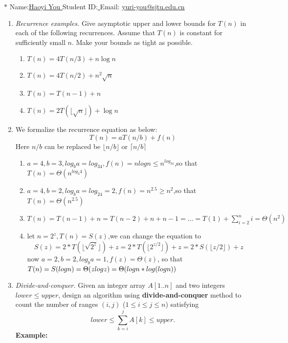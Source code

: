 \documentclass[12pt,a4paper]{article}
\makeatletter
\newtheorem*{solution}{Solution}
\theoremstyle{definition}
\renewenvironment{solution}[1][Solution] {\par\pushQED{\qed}\normalfont\topsep6\p@\@plus6\p@\relax\trivlist\item[\hskip\labelsep\bfseries#1\@addpunct{.}]\ignorespaces}{\popQED\endtrivlist\@endpefalse} \makeatother
\makeatother
\begin{document}
\noindent

\noindent{}
\begin{center}

\footnotesize{\color{blue}$*$ Name:\underline{\quad   Haoyi You  \quad  }\quad Student ID:\underline{ \quad} \quad Email: \underline{\quad yuri-you@sjtu.edu.cn \quad}}
\end{center}

\begin{enumerate}
\item
    \textit{Recurrence examples.} Give asymptotic upper and lower bounds for $T(n)$ in each of the following recurrences. Assume that $T(n)$ is constant for sufficiently small $n$. Make your bounds as tight as possible.
\begin{enumerate}
	\item $T(n)=4 T(n / 3)+n \log n$
	\item $T(n)=4 T(n / 2)+n^{2} \sqrt{n}$
	\item $T(n)=T(n-1)+n$	
	\item $T(n)=2T(\lfloor \sqrt n\rfloor)+\log n$
\end{enumerate}
\begin{solution}
    We formalize the recurrence equation as below:
    \begin{equation}
        T(n)=aT(n/b)+f(n)
    \end{equation}
    Here $n/b$ can be replaced be $\lfloor n/b\rfloor$ or $\lceil n/b\rceil$ 
	\begin{enumerate}
	\item $a=4,b=3,log_b a=log_34,f(n)=n log n\le n^{log_34}$,so that $T(n)=\Theta(n^{log_3 4})$
	\item $a=4,b=2,log_b a=log_24=2,f(n)=n^{2.5}\ge n^2$,so that $T(n)=\Theta(n^{2.5})$
	\item $T(n)=T(n-1)+n=T(n-2)+n+n-1=...=T(1)+\sum_{i=2}^{n}i=\Theta(n^2)$
	\item let $n=2^z,T(n)=S(z)$,we can change the equation to
	\begin{equation}
	    S(z)=2*T(\lfloor\sqrt{2^z}\rfloor)+z=2*T(\lfloor2^{z/2}\rfloor)+z=2*S(\lfloor z/2\rfloor)+z
	\end{equation}
	now $a=2,b=2,log_b a=1,f(z)=\Theta(z)$, so that $T(n)=S(logn)=\Theta(z log z)=\\\Theta(logn*log(logn))$
\end{enumerate} 
\end{solution}
\item
\textit{Divide-and-conquer.} Given an integer array $A[1..n]$ and two integers $lower \le upper$, design an algorithm using \textbf{divide-and-conquer} method to count the number of ranges $(i,j)$ ($1 \leq i \leq j \leq n$) satisfying
$$
    lower \leq \sum_{k=i}^{j}{A[k]} \leq upper.
$$
\textbf{Example:}


\end{enumerate}
\end{document}
